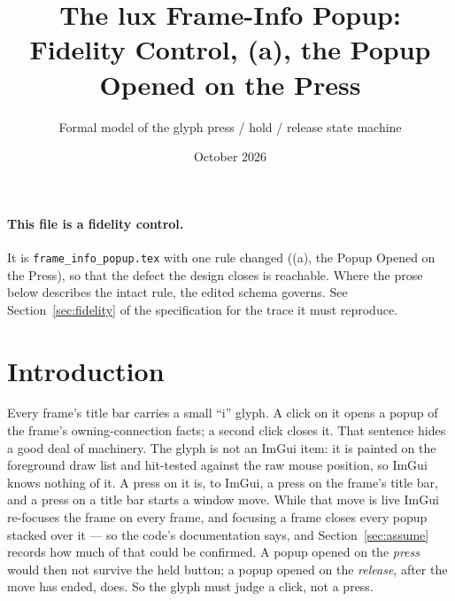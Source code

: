 \documentclass[a4paper,10pt,fleqn]{article}
\begin{document}
\title{The lux Frame-Info Popup: Fidelity Control, (a), the Popup Opened on the Press}
\author{Formal model of the glyph press / hold / release state machine}
\date{October 2026}
\maketitle

\paragraph{This file is a fidelity control.}
It is \texttt{frame\_info\_popup.tex} with one rule changed ((a), the Popup Opened on the Press), so that
the defect the design closes is reachable.  Where the prose below describes
the intact rule, the edited schema governs.  See Section~\ref{sec:fidelity} of
the specification for the trace it must reproduce.

\section{Introduction}

Every frame's title bar carries a small ``i'' glyph.  A click on it opens a
popup of the frame's owning-connection facts; a second click closes it.  That
sentence hides a good deal of machinery.  The glyph is not an ImGui item: it is
painted on the foreground draw list and hit-tested against the raw mouse
position, so ImGui knows nothing of it.  A press on it is, to ImGui, a press on
the frame's title bar, and a press on a title bar starts a window move.  While
that move is live ImGui re-focuses the frame on every frame, and focusing a
frame closes every popup stacked over it --- so the code's documentation says,
and Section~\ref{sec:assume} records how much of that could be confirmed.  A
popup opened on the \emph{press} would then not survive the held button; a
popup opened on the \emph{release}, after the move has ended, does.  So the glyph
must judge a click, not a press.
\end{document}
